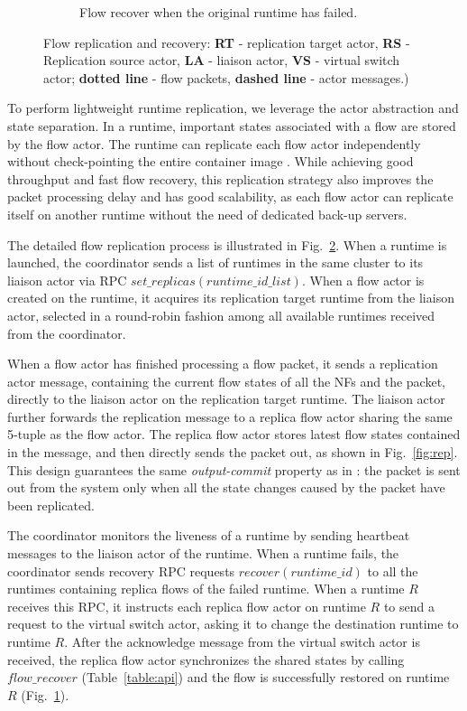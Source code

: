 \begin{figure}[!h]
\begin{subfigure}[t]{0.49\linewidth}
     \caption{Flow recover when the original runtime has failed.}\label{fig:recover}
    \end{subfigure}
 \caption{Flow replication and recovery: \textbf{RT} - replication target actor, \textbf{RS} - Replication source actor, \textbf{LA} - liaison actor, \textbf{VS} - virtual switch actor; \textbf{dotted line} - flow packets, \textbf{dashed line} - actor messages.)}
\label{fig:flow-rep}
\end{figure}

To perform lightweight runtime replication, we leverage the actor abstraction and state separation. In a runtime, important states associated with a flow are stored by the flow actor. The runtime can replicate each flow actor independently without check-pointing the entire container image \cite{sherry2015rollback, rajagopalan2013pico}. While achieving good throughput and fast flow recovery, this replication strategy also improves the packet processing delay and has good scalability, as each flow actor can replicate itself on another runtime without the need of dedicated back-up servers.

The detailed flow replication process is illustrated in Fig.~\ref{fig:flow-rep}. When a runtime is launched, the coordinator sends a list of runtimes in the same cluster to its liaison actor via RPC $set\_replicas(runtime\_id\_list)$. When a flow actor is created on the runtime, it acquires its replication target runtime from the liaison actor, selected in a round-robin fashion among all available runtimes received from the coordinator.

When a flow actor has finished processing a flow packet, it sends a replication actor message, containing the current flow states of all the NFs and the packet, directly to the liaison actor on the replication target runtime. The liaison actor further forwards the replication message to a replica flow actor sharing the same 5-tuple as the flow actor. The replica flow actor stores latest flow states contained in the message, and then directly sends the packet out, as shown in Fig.~\ref{fig:rep}. This design guarantees the same \textit{output-commit} property as in \cite{sherry2015rollback}: the packet is sent out from the system only when all the state changes caused by the packet have been replicated.

The coordinator monitors the liveness of a runtime by sending heartbeat messages to the liaison actor of the runtime. When a runtime fails, the coordinator sends recovery RPC requests $recover(runtime\_id) $ to all the runtimes containing replica flows of the failed runtime. When a runtime $R$ receives this RPC, it instructs each replica flow actor on runtime $R$ to send a request to the virtual switch actor, asking it to change the destination runtime to runtime $R$. After the acknowledge message from the virtual switch actor is received, the replica flow actor synchronizes the shared states by calling $flow\_recover$ (Table~\ref{table:api}) and the flow is successfully restored on runtime $R$ (Fig.~\ref{fig:recover}).

